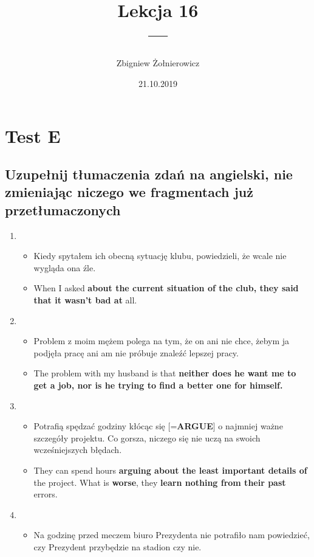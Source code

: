 \documentclass[a4paper]{article}
\begin{document}
\title{{\huge Lekcja 16} \\
{\large ---}}
\author{Zbigniew Żołnierowicz}
\date{21.10.2019}
\maketitle
\section{Test E}
\subsection*{Uzupełnij tłumaczenia zdań na angielski, nie zmieniając niczego we fragmentach już przetłumaczonych}
\begin{enumerate}
    \item \begin{itemize}
        \item Kiedy spytałem ich obecną sytuację klubu, powiedzieli, że wcale nie wygląda ona źle.
        \item When I asked {\bf about the current situation of the club, they said that it wasn't bad at} all.
    \end{itemize}
    \item \begin{itemize}
        \item Problem z moim mężem polega na tym, że on ani nie chce, żebym ja podjęła pracę ani am nie próbuje znaleźć lepszej pracy.
        \item The problem with my husband is that {\bf neither does he want me to get a job, nor is he trying to find a better one for himself.}
    \end{itemize}
    \item \begin{itemize}
        \item Potrafią spędzać godziny kłócąc się [={\bf ARGUE}] o najmniej ważne szczegóły projektu. Co gorsza, niczego się nie uczą na swoich wcześniejszych błędach.
        \item They can spend hours {\bf arguing about the least important details of} the project. What is {\bf worse}, they {\bf learn nothing from their past} errors.
    \end{itemize}
    \item \begin{itemize}
        \item Na godzinę przed meczem biuro Prezydenta nie potrafiło nam powiedzieć, czy Prezydent przybędzie na stadion czy nie.

\end{itemize}
\end{enumerate}
\end{document}
